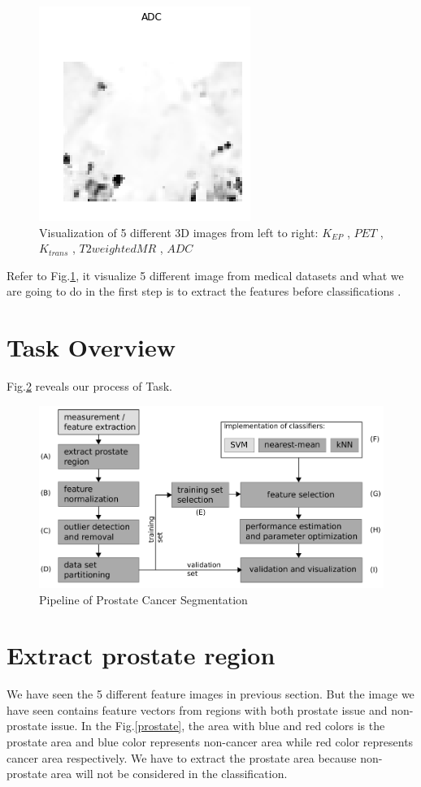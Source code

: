 \documentclass[12pt,DIV14,BCOR12mm,a4paper,footinclude=false,headinclude,parskip=half-,twoside,openright,cleardoublepage=empty,toc=index,bibliography=totoc,listof=totoc]{scrreprt}
\numberwithin{equation}{chapter}
\begin{document}
\begin{figure}
	\includegraphics[scale=0.32]{image/ADC}
	\caption{Visualization of 5 different 3D images from left to right: $K_{EP}$ , $PET$ , $K_{trans}$ , $T2 weighted MR$ , $ADC$ }
	\label{5features}
\end{figure}

Refer to Fig.\ref{5features}, it visualize 5 different image from medical datasets and what we are going to do in the first step is to extract the features before classifications .

\section{Task Overview}
Fig.\ref{feature_ext} reveals our process of Task.


\begin{figure}
	\centering
	\includegraphics[scale=0.6]{image/task1_pipeline}
	\caption{Pipeline of Prostate Cancer Segmentation}
	\label{feature_ext}
\end{figure}

\section{Extract prostate region}
We have seen the 5 different feature images in previous section. But the image we have seen contains feature vectors from regions with both prostate issue and non-prostate issue. In the Fig.\ref{prostate}, the area with blue and red colors is the prostate area and blue color represents non-cancer area while red color represents cancer area respectively. We have to extract the prostate area because non-prostate area will not be considered in the classification.
\end{document}
